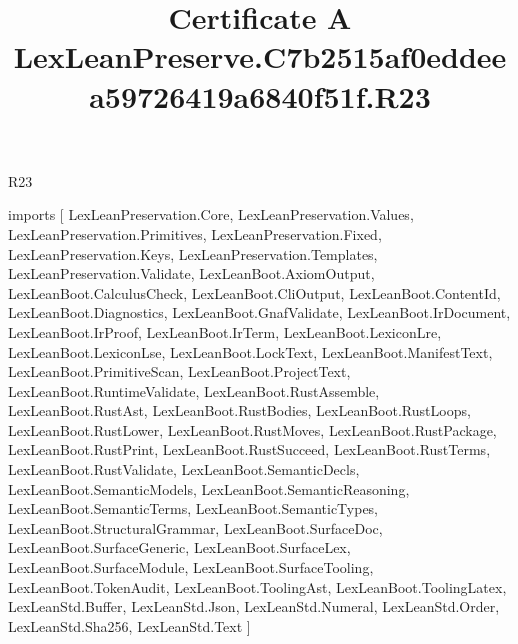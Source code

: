 \begin{lexlean}{R23}
\title{Certificate A LexLeanPreserve.C7b2515af0eddeea59726419a6840f51f.R23}
\begin{coremodule}
imports [
  LexLeanPreservation.Core,
  LexLeanPreservation.Values,
  LexLeanPreservation.Primitives,
  LexLeanPreservation.Fixed,
  LexLeanPreservation.Keys,
  LexLeanPreservation.Templates,
  LexLeanPreservation.Validate,
  LexLeanBoot.AxiomOutput,
  LexLeanBoot.CalculusCheck,
  LexLeanBoot.CliOutput,
  LexLeanBoot.ContentId,
  LexLeanBoot.Diagnostics,
  LexLeanBoot.GnafValidate,
  LexLeanBoot.IrDocument,
  LexLeanBoot.IrProof,
  LexLeanBoot.IrTerm,
  LexLeanBoot.LexiconLre,
  LexLeanBoot.LexiconLse,
  LexLeanBoot.LockText,
  LexLeanBoot.ManifestText,
  LexLeanBoot.PrimitiveScan,
  LexLeanBoot.ProjectText,
  LexLeanBoot.RuntimeValidate,
  LexLeanBoot.RustAssemble,
  LexLeanBoot.RustAst,
  LexLeanBoot.RustBodies,
  LexLeanBoot.RustLoops,
  LexLeanBoot.RustLower,
  LexLeanBoot.RustMoves,
  LexLeanBoot.RustPackage,
  LexLeanBoot.RustPrint,
  LexLeanBoot.RustSucceed,
  LexLeanBoot.RustTerms,
  LexLeanBoot.RustValidate,
  LexLeanBoot.SemanticDecls,
  LexLeanBoot.SemanticModels,
  LexLeanBoot.SemanticReasoning,
  LexLeanBoot.SemanticTerms,
  LexLeanBoot.SemanticTypes,
  LexLeanBoot.StructuralGrammar,
  LexLeanBoot.SurfaceDoc,
  LexLeanBoot.SurfaceGeneric,
  LexLeanBoot.SurfaceLex,
  LexLeanBoot.SurfaceModule,
  LexLeanBoot.SurfaceTooling,
  LexLeanBoot.TokenAudit,
  LexLeanBoot.ToolingAst,
  LexLeanBoot.ToolingLatex,
  LexLeanStd.Buffer,
  LexLeanStd.Json,
  LexLeanStd.Numeral,
  LexLeanStd.Order,
  LexLeanStd.Sha256,
  LexLeanStd.Text
]


\end{coremodule}
\end{lexlean}
